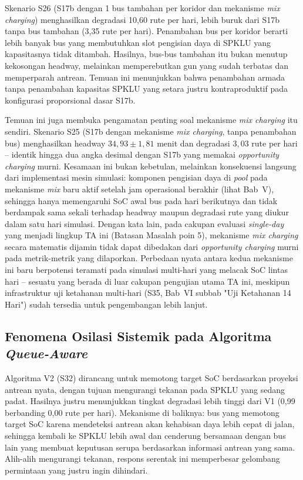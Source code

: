 Skenario S26 (S17b dengan 1 bus tambahan per koridor dan mekanisme
\textit{mix charging}) menghasilkan degradasi 10,60 rute per hari,
lebih buruk dari S17b tanpa bus tambahan (3,35 rute per hari). Penambahan
bus per koridor berarti lebih banyak bus yang membutuhkan slot pengisian
daya di SPKLU yang kapasitasnya tidak ditambah. Hasilnya, bus-bus tambahan
itu bukan menutup kekosongan headway, melainkan memperebutkan gun yang
sudah terbatas dan memperparah antrean. Temuan ini menunjukkan bahwa
penambahan armada tanpa penambahan kapasitas SPKLU yang setara justru
kontraproduktif pada konfigurasi proporsional dasar S17b.

Temuan ini juga membuka pengamatan penting soal mekanisme \textit{mix
charging} itu sendiri. Skenario S25 (S17b dengan mekanisme \textit{mix
charging}, tanpa penambahan bus) menghasilkan headway $34{,}93 \pm 1{,}81$
menit dan degradasi $3{,}03$ rute per hari -- identik hingga dua angka
desimal dengan S17b yang memakai \textit{opportunity charging} murni.
Kesamaan ini bukan kebetulan, melainkan konsekuensi langsung dari
implementasi mesin simulasi: komponen pengisian daya di \textit{pool}
pada mekanisme \textit{mix} baru aktif setelah jam operasional berakhir
(lihat Bab~V), sehingga hanya memengaruhi SoC awal bus pada hari
berikutnya dan tidak berdampak sama sekali terhadap headway maupun
degradasi rute yang diukur dalam satu hari simulasi. Dengan kata lain,
pada cakupan evaluasi \textit{single-day} yang menjadi lingkup TA ini
(Batasan Masalah poin 5), mekanisme \textit{mix charging} secara
matematis dijamin tidak dapat dibedakan dari \textit{opportunity
charging} murni pada metrik-metrik yang dilaporkan. Perbedaan nyata
antara kedua mekanisme ini baru berpotensi teramati pada simulasi
multi-hari yang melacak SoC lintas hari -- sesuatu yang berada di luar
cakupan pengujian utama TA ini, meskipun infrastruktur uji ketahanan
multi-hari (S35, Bab~VI subbab "Uji Ketahanan 14 Hari") sudah tersedia
untuk pengembangan lebih lanjut.

\subsection{Fenomena Osilasi Sistemik pada Algoritma \textit{Queue-Aware}}

Algoritma V2 (S32) dirancang untuk memotong target SoC berdasarkan
proyeksi antrean nyata, dengan tujuan mengurangi tekanan pada SPKLU yang
sedang padat. Hasilnya justru menunjukkan tingkat degradasi lebih tinggi
dari V1 (0,99 berbanding 0,00 rute per hari). Mekanisme di baliknya: bus
yang memotong target SoC karena mendeteksi antrean akan kehabisan daya
lebih cepat di jalan, sehingga kembali ke SPKLU lebih awal dan cenderung
bersamaan dengan bus lain yang membuat keputusan serupa berdasarkan
informasi antrean yang sama. Alih-alih mengurangi tekanan, respons
serentak ini memperbesar gelombang permintaan yang justru ingin dihindari.

